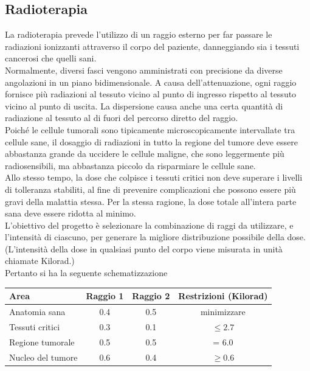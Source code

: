 \documentclass[a4paper]{extarticle}
\renewcommand\arraystretch{}
\begin{document}
\subsection{Radioterapia}
La radioterapia prevede l'utilizzo di un raggio esterno per far passare le radiazioni ionizzanti attraverso il corpo del paziente, danneggiando sia i tessuti cancerosi che quelli sani.\\
Normalmente, diversi fasci vengono amministrati con precisione da diverse angolazioni in un piano bidimensionale. A causa dell'attenuazione, ogni raggio fornisce più radiazioni al tessuto vicino al punto di ingresso rispetto al tessuto vicino al punto di uscita. La dispersione causa anche una certa quantità di radiazione al tessuto al di fuori del percorso diretto del raggio.\\
Poiché le cellule tumorali sono tipicamente microscopicamente intervallate tra cellule sane, il dosaggio di radiazioni in tutto la regione del tumore deve essere abbastanza grande da uccidere le cellule maligne, che sono leggermente più radiosensibili, ma abbastanza piccolo da risparmiare le cellule sane.\\
Allo stesso tempo, la dose che colpisce i tessuti critici non deve superare i livelli di tolleranza stabiliti, al fine di prevenire complicazioni che possono essere più gravi della malattia stessa. Per la stessa ragione, la dose totale all'intera parte sana deve essere ridotta al minimo.\\
L'obiettivo del progetto è selezionare la combinazione di raggi da utilizzare, e l'intensità di ciascuno, per generare la migliore distribuzione possibile della dose. (L'intensità della dose in qualsiasi punto del corpo viene misurata in unità chiamate Kilorad.)\\
Pertanto si ha la seguente schematizzazione

\begin{table}[H]
\setlength{\tabcolsep}{8pt}
\renewcommand{\arraystretch}{1.5}
\noindent
\centering
\begin{tabular}{l|c|c|c}
    Area   & Raggio 1 & Raggio 2 & Restrizioni (Kilorad)\\
    \hline
    Anatomia sana     & 0.4 & 0.5 & minimizzare\\
    Tessuti critici   & 0.3 & 0.1 & $\leq 2.7$\\
    Regione tumorale  & 0.5 & 0.5 & = 6.0\\
    Nucleo del tumore & 0.6 & 0.4 & $\geq 0.6$\\
    \hline
\end{tabular}
\end{table}
\end{document}
